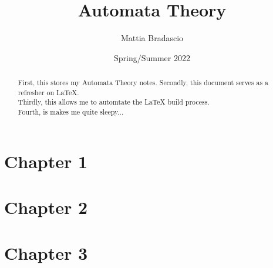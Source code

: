 \documentclass[12pt, letterpaper]{article}
\title{Automata Theory}
\author{Mattia Bradascio}
\date{Spring/Summer 2022}
\begin{document}
\begin{titlepage}
\maketitle
\end{titlepage}

\begin{abstract}

    First, this stores my Automata Theory notes.
    \indent Secondly, this document serves as a refresher on LaTeX. \\
    \indent Thirdly, this allows me to automtate the LaTeX build process. \\ 
    \indent Fourth, is makes me quite sleepy...

\end{abstract}

\section{Chapter 1}


\section{Chapter 2}


\section{Chapter 3}

\end{document}

